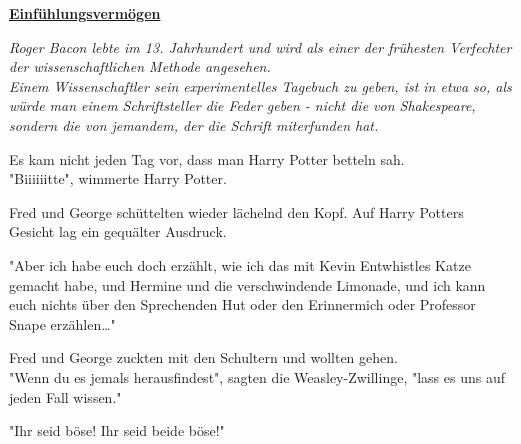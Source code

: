 

\hypertarget{einfuxfchlungsvermuxf6gen}{%

\textbf{\uline{Einfühlungsvermögen}}

\emph{Roger Bacon lebte im 13. Jahrhundert und wird als einer der frühesten Verfechter der wissenschaftlichen Methode angesehen.\\ Einem Wissenschaftler sein experimentelles Tagebuch zu geben, ist in etwa so, als würde man einem Schriftsteller die Feder geben - nicht die von Shakespeare, sondern die von jemandem, der die Schrift miterfunden hat.}

Es kam nicht jeden Tag vor, dass man Harry Potter betteln sah.\\ "Biiiiiitte", wimmerte Harry Potter.

Fred und George schüttelten wieder lächelnd den Kopf. Auf Harry Potters Gesicht lag ein gequälter Ausdruck.

"Aber ich habe euch doch erzählt, wie ich das mit Kevin Entwhistles Katze gemacht habe, und Hermine und die verschwindende Limonade, und ich kann euch nichts über den Sprechenden Hut oder den Erinnermich oder Professor Snape erzählen…"

Fred und George zuckten mit den Schultern und wollten gehen.\\ "Wenn du es jemals herausfindest", sagten die Weasley-Zwillinge, "lass es uns auf jeden Fall wissen."

"Ihr seid böse! Ihr seid beide böse!"

}
